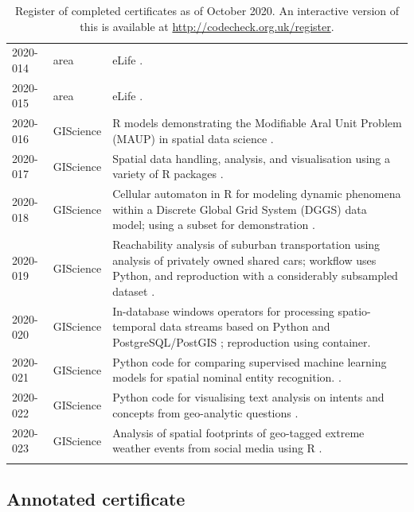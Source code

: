 \documentclass[12pt]{article}
\begin{document}
\begin{table}
\begin{tabular}{llp{11cm}}
    2020-014  \cite{cert-2020-014} & area & eLife \cite{Sadeh2020}. \\
    2020-015  \cite{cert-2020-015} & area & eLife \cite{Liou2020}. \\
    2020-016  \cite{cert-2020-016} & GIScience & 
    R models demonstrating the Modifiable Aral Unit Problem (MAUP) in spatial data science \cite{Brunsdon2020}. \\
    2020-017  \cite{cert-2020-017} & GIScience & 
    Spatial data handling, analysis, and visualisation using a variety of R packages \cite{Bivand2020}. \\
    2020-018  \cite{cert-2020-018} & GIScience & 
    Cellular automaton in R for modeling dynamic phenomena within a Discrete Global Grid System (DGGS) data model; using a subset for demonstration \cite{Hojati2020}. \\
    2020-019  \cite{cert-2020-019} & GIScience & Reachability analysis of suburban transportation using analysis of privately owned shared cars; workflow uses Python, and reproduction with a considerably subsampled dataset \cite{Illium2020}. \\
    2020-020  \cite{cert-2020-020} & GIScience & In-database windows operators for processing spatio-temporal data streams based on Python and PostgreSQL/PostGIS \cite{Werner2020}; reproduction using container. \\
    2020-021  \cite{cert-2020-021} & GIScience & Python code for comparing supervised machine learning models for spatial nominal entity recognition. \cite{Medad2020}. \\
    2020-022  \cite{cert-2020-022} & GIScience & Python code for visualising text analysis on intents and concepts from geo-analytic questions \cite{Xu2020}. \\
    2020-023  \cite{cert-2020-023} & GIScience & Analysis of spatial footprints of geo-tagged extreme weather events from social media using R \cite{Owuor2020}. \\
    \\ \bottomrule
  \end{tabular}
  \caption{Register of completed certificates as of October 2020.  An interactive version
  of this is available at \url{http://codecheck.org.uk/register}. %
  }
  \label{tab:register}
\end{table}

\subsection*{Annotated certificate}\label{annotated-certificate}
\end{document}
